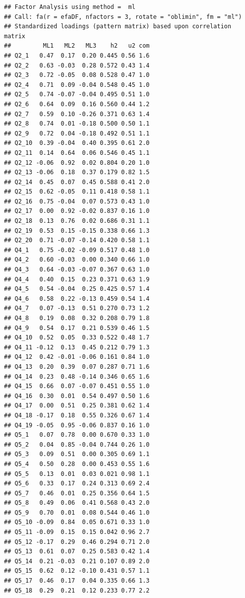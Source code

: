 \documentclass[
  man]{apa6}
\begin{document}
\begin{verbatim}
## Factor Analysis using method =  ml
## Call: fa(r = efaDF, nfactors = 3, rotate = "oblimin", fm = "ml")
## Standardized loadings (pattern matrix) based upon correlation matrix
##         ML1   ML2   ML3    h2   u2 com
## Q2_1   0.47  0.17  0.20 0.445 0.56 1.6
## Q2_2   0.63 -0.03  0.28 0.572 0.43 1.4
## Q2_3   0.72 -0.05  0.08 0.528 0.47 1.0
## Q2_4   0.71  0.09 -0.04 0.548 0.45 1.0
## Q2_5   0.74 -0.07 -0.04 0.495 0.51 1.0
## Q2_6   0.64  0.09  0.16 0.560 0.44 1.2
## Q2_7   0.59  0.10 -0.26 0.371 0.63 1.4
## Q2_8   0.74  0.01 -0.18 0.500 0.50 1.1
## Q2_9   0.72  0.04 -0.18 0.492 0.51 1.1
## Q2_10  0.39 -0.04  0.40 0.395 0.61 2.0
## Q2_11  0.14  0.64  0.06 0.546 0.45 1.1
## Q2_12 -0.06  0.92  0.02 0.804 0.20 1.0
## Q2_13 -0.06  0.18  0.37 0.179 0.82 1.5
## Q2_14  0.45  0.07  0.45 0.588 0.41 2.0
## Q2_15  0.62 -0.05  0.11 0.418 0.58 1.1
## Q2_16  0.75 -0.04  0.07 0.573 0.43 1.0
## Q2_17  0.00  0.92 -0.02 0.837 0.16 1.0
## Q2_18  0.13  0.76  0.02 0.686 0.31 1.1
## Q2_19  0.53  0.15 -0.15 0.338 0.66 1.3
## Q2_20  0.71 -0.07 -0.14 0.420 0.58 1.1
## Q4_1   0.75 -0.02 -0.09 0.517 0.48 1.0
## Q4_2   0.60 -0.03  0.00 0.340 0.66 1.0
## Q4_3   0.64 -0.03 -0.07 0.367 0.63 1.0
## Q4_4   0.40  0.15  0.23 0.371 0.63 1.9
## Q4_5   0.54 -0.04  0.25 0.425 0.57 1.4
## Q4_6   0.58  0.22 -0.13 0.459 0.54 1.4
## Q4_7   0.07 -0.13  0.51 0.270 0.73 1.2
## Q4_8   0.19  0.08  0.32 0.208 0.79 1.8
## Q4_9   0.54  0.17  0.21 0.539 0.46 1.5
## Q4_10  0.52  0.05  0.33 0.522 0.48 1.7
## Q4_11 -0.12  0.13  0.45 0.212 0.79 1.3
## Q4_12  0.42 -0.01 -0.06 0.161 0.84 1.0
## Q4_13  0.20  0.39  0.07 0.287 0.71 1.6
## Q4_14  0.23  0.48 -0.14 0.346 0.65 1.6
## Q4_15  0.66  0.07 -0.07 0.451 0.55 1.0
## Q4_16  0.30  0.01  0.54 0.497 0.50 1.6
## Q4_17  0.00  0.51  0.25 0.381 0.62 1.4
## Q4_18 -0.17  0.18  0.55 0.326 0.67 1.4
## Q4_19 -0.05  0.95 -0.06 0.837 0.16 1.0
## Q5_1   0.07  0.78  0.00 0.670 0.33 1.0
## Q5_2   0.04  0.85 -0.04 0.744 0.26 1.0
## Q5_3   0.09  0.51  0.00 0.305 0.69 1.1
## Q5_4   0.50  0.28  0.00 0.453 0.55 1.6
## Q5_5   0.13  0.01  0.03 0.021 0.98 1.1
## Q5_6   0.33  0.17  0.24 0.313 0.69 2.4
## Q5_7   0.46  0.01  0.25 0.356 0.64 1.5
## Q5_8   0.49  0.06  0.41 0.568 0.43 2.0
## Q5_9   0.70  0.01  0.08 0.544 0.46 1.0
## Q5_10 -0.09  0.84  0.05 0.671 0.33 1.0
## Q5_11 -0.09  0.15  0.15 0.042 0.96 2.7
## Q5_12 -0.17  0.29  0.46 0.294 0.71 2.0
## Q5_13  0.61  0.07  0.25 0.583 0.42 1.4
## Q5_14  0.21 -0.03  0.21 0.107 0.89 2.0
## Q5_15  0.62  0.12 -0.10 0.431 0.57 1.1
## Q5_17  0.46  0.17  0.04 0.335 0.66 1.3
## Q5_18  0.29  0.21  0.12 0.233 0.77 2.2

\end{verbatim}
\end{document}
